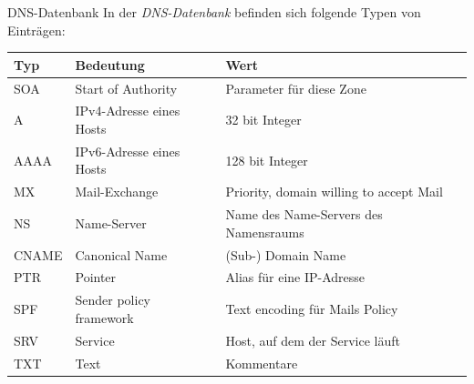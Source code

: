 \begin{bonus}{DNS-Datenbank}
    In der \emph{DNS-Datenbank} befinden sich folgende Typen von Einträgen:

    \begin{tabular}{|l|l|l|}
        \hline
        Typ   & Bedeutung                & Wert                                    \\\hline\hline
        SOA   & Start of Authority       & Parameter für diese Zone                \\\hline
        A     & IPv4-Adresse eines Hosts & 32 bit Integer                          \\\hline
        AAAA  & IPv6-Adresse eines Hosts & 128 bit Integer                         \\\hline
        MX    & Mail-Exchange            & Priority, domain willing to accept Mail \\\hline
        NS    & Name-Server              & Name des Name-Servers des Namensraums   \\\hline
        CNAME & Canonical Name           & (Sub-) Domain Name                      \\\hline
        PTR   & Pointer                  & Alias für eine IP-Adresse               \\\hline
        SPF   & Sender policy framework  & Text encoding für Mails Policy          \\\hline
        SRV   & Service                  & Host, auf dem der Service läuft         \\\hline
        TXT   & Text                     & Kommentare                              \\\hline
    \end{tabular}
\end{bonus}

